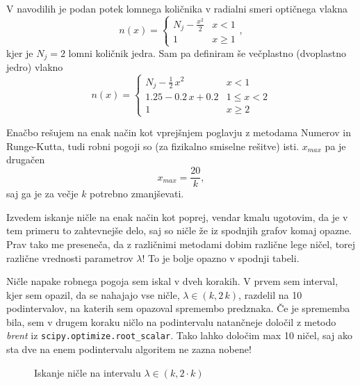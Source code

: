 V navodilih je podan potek lomnega količnika v radialni smeri optičnega vlakna
\begin{equation}
    n(x) =
    \begin{cases}
        N_j-\frac{x^2}{2} & x < 1\\
        1 & x \geq 1
    \end{cases},
\end{equation}
kjer je $N_j=2$ lomni količnik jedra. Sam pa definiram še večplastno (dvoplastno jedro) vlakno
\begin{equation}
    n(x) =
    \begin{cases}
        N_j-\frac{1}{2}\,x^2 & x < 1\\
        1.25-0.2\,x+0.2 & 1 \leq x < 2\\
        1 & x \geq 2
    \end{cases}
\end{equation}
\begin{figure}[H]
    \centering
\end{figure}

Enačbo rešujem na enak način kot vprejšnjem poglavju z metodama Numerov in Runge-Kutta, tudi robni pogoji so (za fizikalno smiselne rešitve) isti. $x_{max}$ pa je drugačen
\begin{equation}
    x_{max}=\frac{20}{k},
\end{equation}
saj ga je za večje $k$ potrebno zmanjševati.

Izvedem iskanje ničle na enak način kot poprej, vendar kmalu ugotovim, da je v tem primeru to zahtevnejše delo, saj so ničle že iz spodnjih grafov komaj opazne. Prav tako me preseneča, da z različnimi metodami dobim različne lege ničel, torej različne vrednosti parametrov $\lambda$! To je bolje opazno v spodnji tabeli.

Ničle napake robnega pogoja sem iskal v dveh korakih. V prvem sem interval, kjer sem opazil, da se nahajajo vse ničle, $\lambda \in (k,2\,k)$, razdelil na 10 podintervalov, na katerih sem opazoval spremembo predznaka. Če je sprememba bila, sem v drugem koraku ničlo na podintervalu natančneje določil z metodo \textit{brent} iz \texttt{scipy.optimize.root\_scalar}. Tako lahko določim max 10 ničel, saj ako sta dve na enem podintervalu algoritem ne zazna nobene!

\begin{figure}[H]
    \centering
    \caption{Iskanje ničle na intervalu $\lambda \in (k, 2\cdot k)$}
\end{figure}

